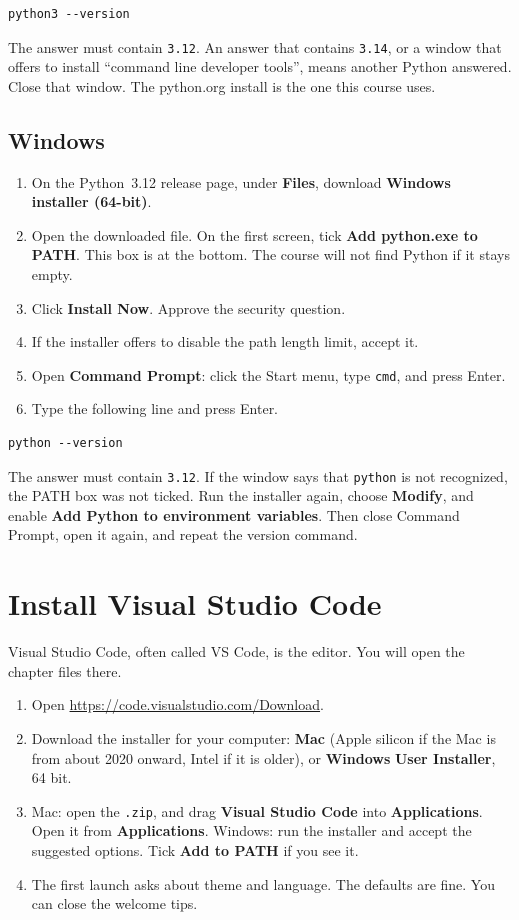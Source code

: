 \documentclass[11pt,a4paper]{article}
\newcommand{\menu}[1]{\textbf{#1}}
\newcommand{\file}[1]{\texttt{#1}}
\newcommand{\cmd}[1]{\texttt{#1}}
\begin{document}
\begin{verbatim}
python3 --version
\end{verbatim}

The answer must contain \cmd{3.12}. An answer that contains \cmd{3.14}, or a window that offers to install ``command line developer tools'', means another Python answered. Close that window. The python.org install is the one this course uses.

\subsection{Windows}

\begin{enumerate}
\item On the Python~3.12 release page, under \menu{Files}, download \textbf{Windows installer (64-bit)}.
\item Open the downloaded file. On the first screen, tick \menu{Add python.exe to PATH}. This box is at the bottom. The course will not find Python if it stays empty.
\item Click \menu{Install Now}. Approve the security question.
\item If the installer offers to disable the path length limit, accept it.
\item Open \menu{Command Prompt}: click the Start menu, type \cmd{cmd}, and press Enter.
\item Type the following line and press Enter.
\end{enumerate}

\begin{verbatim}
python --version
\end{verbatim}

The answer must contain \cmd{3.12}. If the window says that \cmd{python} is not recognized, the PATH box was not ticked. Run the installer again, choose \menu{Modify}, and enable \menu{Add Python to environment variables}. Then close Command Prompt, open it again, and repeat the version command.

\section{Install Visual Studio Code}

Visual Studio Code, often called VS Code, is the editor. You will open the chapter files there.

\begin{enumerate}
\item Open \url{https://code.visualstudio.com/Download}.
\item Download the installer for your computer: \menu{Mac} (Apple silicon if the Mac is from about 2020 onward, Intel if it is older), or \menu{Windows} \menu{User Installer}, 64 bit.
\item Mac: open the \file{.zip}, and drag \menu{Visual Studio Code} into \menu{Applications}. Open it from \menu{Applications}. Windows: run the installer and accept the suggested options. Tick \menu{Add to PATH} if you see it.
\item The first launch asks about theme and language. The defaults are fine. You can close the welcome tips.
\end{enumerate}
\end{document}
